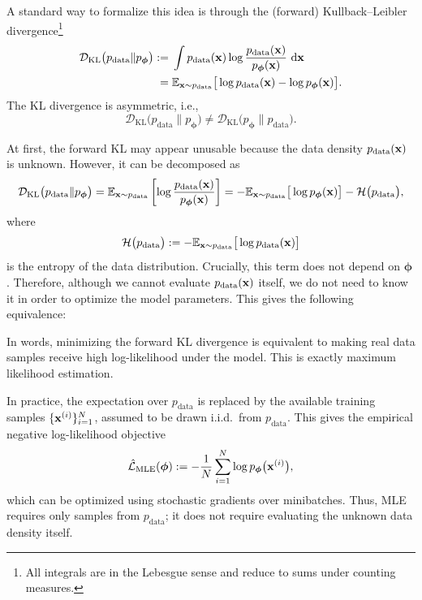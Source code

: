 A standard way to formalize this idea is through the (forward)
Kullback--Leibler divergence\footnote{All integrals are in the Lebesgue sense
and reduce to sums under counting measures.}
\begin{align*}
\mathcal{D}_{\mathrm{KL}}
\big(p_{\mathrm{data}}\|p_{\bm{\phi}}\big)
:=\;&
\int
p_{\mathrm{data}}({\mathbf{x}})
\log
\frac{p_{\mathrm{data}}({\mathbf{x}})}
     {p_{\bm{\phi}}({\mathbf{x}})}
\,\mathop{}\!\mathrm{d} {\mathbf{x}}
\\
=\;&
\mathbb{E}_{{\mathbf{x}}\sim p_{\mathrm{data}}}
\big[
\log p_{\mathrm{data}}({\mathbf{x}})
-
\log p_{\bm{\phi}}({\mathbf{x}})
\big].
\end{align*}
The KL divergence is asymmetric, i.e.,
\[
\mathcal{D}_{\mathrm{KL}}
\big(p_{\mathrm{data}}\|p_{\bm{\phi}}\big)
\neq
\mathcal{D}_{\mathrm{KL}}
\big(p_{\bm{\phi}}\|p_{\mathrm{data}}\big).
\]

At first, the forward KL may appear unusable because the data density
$p_{\mathrm{data}}({\mathbf{x}})$ is unknown.
However, it can be decomposed as
\begin{align*}
\mathcal{D}_{\mathrm{KL}}
\big(p_{\mathrm{data}}\|p_{\bm{\phi}}\big)
=
\mathbb{E}_{{\mathbf{x}}\sim p_{\mathrm{data}}}
\left[
\log
\frac{p_{\mathrm{data}}({\mathbf{x}})}
     {p_{\bm{\phi}}({\mathbf{x}})}
\right]
=
-\mathbb{E}_{{\mathbf{x}}\sim p_{\mathrm{data}}}
\big[
\log p_{\bm{\phi}}({\mathbf{x}})
\big]
-
\mathcal{H}\big(p_{\mathrm{data}}\big),
\end{align*}
where
\[
\mathcal{H}\big(p_{\mathrm{data}}\big)
:=
-\mathbb{E}_{{\mathbf{x}}\sim p_{\mathrm{data}}}
\big[
\log p_{\mathrm{data}}({\mathbf{x}})
\big]
\]
is the entropy of the data distribution.
Crucially, this term does not depend on $\bm{\phi}$.
Therefore, although we cannot evaluate $p_{\mathrm{data}}({\mathbf{x}})$ itself,
we do not need to know it in order to optimize the model parameters. This gives the following equivalence:

In words, minimizing the forward KL divergence is equivalent to making real
data samples receive high log-likelihood under the model.
This is exactly maximum likelihood estimation.

In practice, the expectation over $p_{\mathrm{data}}$ is replaced by the
available training samples
$\{{\mathbf{x}}^{(i)}\}_{i=1}^{N}$, assumed to be drawn i.i.d.\ from
$p_{\mathrm{data}}$.
This gives the empirical negative log-likelihood objective
\begin{align*}
\hat{\mathcal{L}}_{\mathrm{MLE}}(\bm{\phi})
:=
-\frac{1}{N}
\sum_{i=1}^{N}
\log p_{\bm{\phi}}\big({\mathbf{x}}^{(i)}\big),
\end{align*}
which can be optimized using stochastic gradients over minibatches.
Thus, MLE requires only samples from $p_{\mathrm{data}}$; it does not require
evaluating the unknown data density itself.

